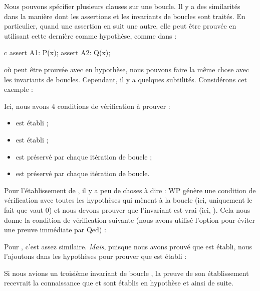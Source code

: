 \label{l3:statements-loops-multi-inv}


Nous pouvons spécifier plusieurs clauses  sur une
boucle. Il y a des similarités dans la manière dont les assertions et les
invariants de boucles sont traités. En particulier, quand une assertion en suit
une autre, elle peut être prouvée en utilisant cette dernière comme hypothèse,
comme dans :
\begin{CodeBlock}{c}
assert A1: P(x);
assert A2: Q(x);
\end{CodeBlock}
où  peut être prouvée avec  en hypothèse, nous
pouvons faire la même chose avec les invariants de boucles. Cependant, il y a
quelques subtilités. Considérons cet exemple :




Ici, nous avons 4 conditions de vérification à prouver :
\begin{itemize}
  \item {} est établi ;
  \item {} est établi ;
  \item {} est préservé par chaque itération de boucle ;
  \item {} est préservé par chaque itération de boucle.
\end{itemize}
Pour l'établissement de , il y a peu de choses à dire : WP
génère une condition de vérification avec toutes les hypothèses qui mènent à la
boucle (ici, uniquement le fait que  vaut 0) et nous devons
prouver que l'invariant est vrai (ici, ). Cela nous donne
la condition de vérification suivante (nous avons utilisé l'option
 pour éviter une preuve immédiate par Qed) :




Pour , c'est assez similaire. \textit{Mais}, puisque nous avons
prouvé que  est établi, nous l'ajoutons dans les hypothèses pour
prouver que  est établi :




Si nous avions un troisième invariant de boucle , la preuve de
son établissement recevrait la connaissance que  et 
sont établis en hypothèse et ainsi de suite.


